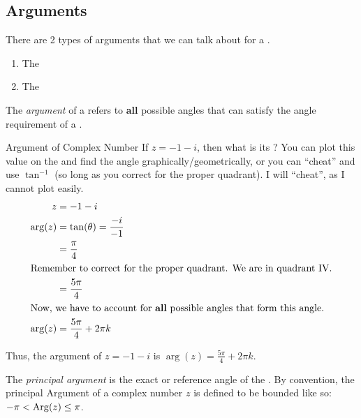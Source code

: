 \subsection{Arguments}\label{subsec:Complex_Number_Arguments}
There are 2 types of arguments that we can talk about for a .
\begin{enumerate}[noitemsep]
\item The 
\item The 
\end{enumerate}

\begin{definition}[Argument]\label{def:Complex_Number_Argument}
  The \emph{argument} of a  refers to \textbf{all} possible angles that can satisfy the angle requirement of a .
\end{definition}

\begin{example}{Argument of Complex Number}
  If $z = -1 - i$, then what is its \textbf{}?
  \tcblower{}
  You can plot this value on the  and find the angle graphically/geometrically, or you can ``cheat'' and use $\tan^{-1}$ (so long as you correct for the proper quadrant).
  I will ``cheat'', as I cannot plot easily.
  \begin{align*}
    z &= -1 - i \\
    \arg(z) &= \tan(\theta) = \frac{-i}{-1} \\
      &= \frac{\pi}{4} \\
    \shortintertext{Remember to correct for the proper quadrant. We are in quadrant IV.}
      &= \frac{5 \pi}{4} \\
    \intertext{Now, we have to account for \textbf{all} possible angles that form this angle.}
    \arg(z) &= \frac{5 \pi}{4} + 2 \pi k
  \end{align*}

  Thus, the argument of $z = -1 - i$ is $\arg(z) = \frac{5 \pi}{4} + 2 \pi k$.
\end{example}

\begin{definition}\label{def:Principal_Argument}
  The \emph{principal argument} is the exact or reference angle of the .
  By convention, the principal Argument of a complex number $z$ is defined to be bounded like so: $-\pi < \operatorname{Arg}(z) \leq \pi$.
\end{definition}


